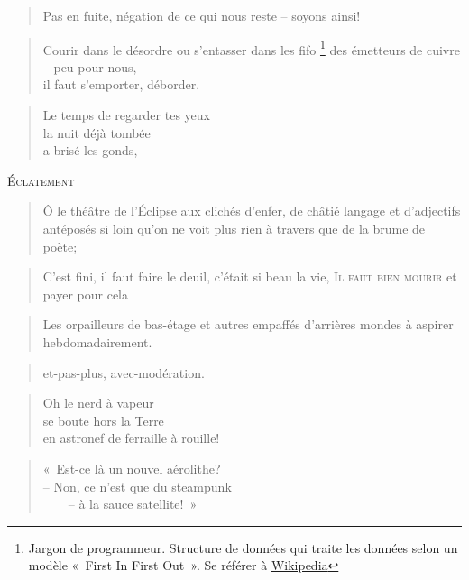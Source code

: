   \begin{verse}
    Pas en fuite, négation de ce qui nous reste -- soyons ainsi!
  \end{verse}
  \begin{verse}
    Courir dans le désordre ou s’entasser dans les fifo
    \footnote{
      Jargon de programmeur. Structure de données qui traite les données
      selon un modèle «~First In First Out~».
      Se référer à \href{https://fr.wikipedia.org/wiki/File_(structure_de_données)}{Wikipedia}
    }
    des émetteurs de cuivre -- peu pour nous,\\
    il faut s’emporter, déborder.
  \end{verse}
  \begin{verse}
    Le temps de regarder tes yeux\\
    la nuit déjà tombée\\
    a brisé les gonds,
  \end{verse}
  \begin{center}
    \textsc{Éclatement}
  \end{center}
  \begin{verse}
    Ô le théâtre de l’Éclipse aux clichés d’enfer, de châtié langage
    et d’adjectifs antéposés  si loin qu’on ne voit plus  rien à travers
    que de la brume de poète;
  \end{verse}
  \begin{verse}
    C’est fini, il faut faire le deuil, c’était si beau la vie, \textsc{Il
    faut bien mourir} et payer pour cela
  \end{verse}
  \begin{verse}
    Les orpailleurs de bas-étage et autres empaffés d’arrières mondes
    à aspirer hebdomadairement.
  \end{verse}
  \begin{verse}
    et-pas-plus, avec-modération.
  \end{verse}
  \begin{verse}
    Oh le nerd à vapeur\\
    se boute hors la Terre\\
    en astronef de ferraille à rouille!
  \end{verse}
  \begin{verse}
    «~Est-ce là un nouvel aérolithe?\\
    -- Non, ce n’est que du steampunk\\
    ~~~~-- à la sauce satellite!~»
  \end{verse}
